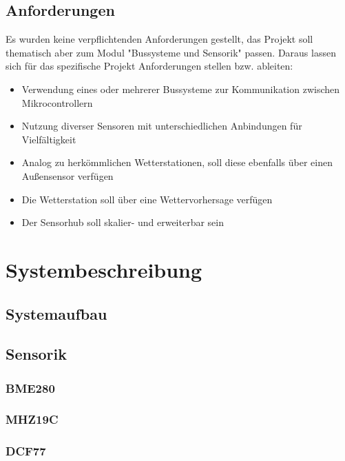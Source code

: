 \documentclass[a4paper,11pt]{article}
\begin{document}
\subsection{Anforderungen}
\label{subsub:anforderungen}

Es wurden keine verpflichtenden Anforderungen gestellt, das Projekt soll thematisch aber zum Modul 
"Bussysteme und Sensorik" passen. Daraus lassen sich für das spezifische Projekt Anforderungen stellen bzw. ableiten:

\begin{itemize}
  \item Verwendung eines oder mehrerer Bussysteme zur Kommunikation zwischen Mikrocontrollern
  \item Nutzung diverser Sensoren mit unterschiedlichen Anbindungen für Vielfältigkeit
  \item Analog zu herkömmlichen Wetterstationen, soll diese ebenfalls über einen Außensensor verfügen
  \item Die Wetterstation soll über eine Wettervorhersage verfügen
  \item Der Sensorhub soll skalier- und erweiterbar sein
\end{itemize}

\section{Systembeschreibung}
\label{sub:systembeschreibung}

\subsection{Systemaufbau}
\label{subsub:systemaufbau}

\subsection{Sensorik}
\label{subsub:sensorik}

\subsubsection{BME280}
\label{subsubsub:bme280}

\subsubsection{MHZ19C}
\label{subsubsub:mhz19c}

\subsubsection{DCF77}
\label{subsubsub:dcf77}
\end{document}

